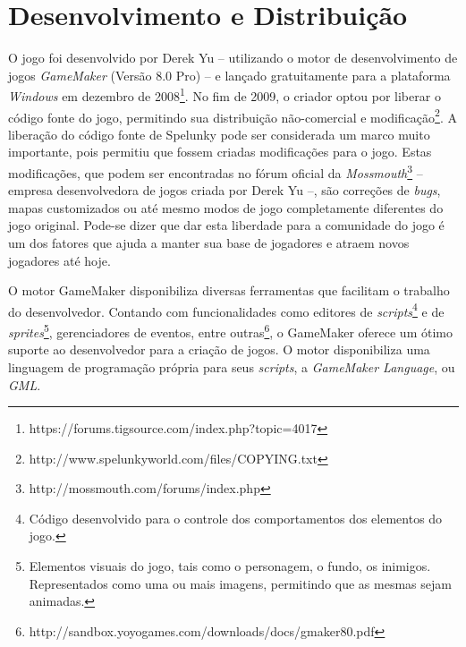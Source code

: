 \section{\label{section:spelunky-dev}Desenvolvimento e Distribuição}
O jogo foi desenvolvido por Derek Yu -- utilizando o motor de desenvolvimento de
jogos \textit{GameMaker} (Versão 8.0 Pro) -- e lançado gratuitamente para a
plataforma \textit{Windows} em dezembro de
2008\footnote{https://forums.tigsource.com/index.php?topic=4017}. No fim de
2009, o criador optou por liberar o código fonte do jogo, permitindo sua
distribuição não-comercial e
modificação\footnote{http://www.spelunkyworld.com/files/COPYING.txt}. A
liberação do código fonte de Spelunky pode ser considerada um marco muito
importante, pois permitiu que fossem criadas modificações para o jogo. Estas
modificações, que podem ser encontradas no fórum oficial da
\textit{Mossmouth}\footnote{http://mossmouth.com/forums/index.php} -- empresa
desenvolvedora de jogos criada por Derek Yu --, são correções de \textit{bugs},
mapas customizados ou até mesmo modos de jogo completamente diferentes do jogo
original. Pode-se dizer que dar esta liberdade para a comunidade do jogo é um
dos fatores que ajuda a manter sua base de jogadores e atraem novos jogadores
até hoje.

O motor GameMaker disponibiliza diversas ferramentas que facilitam o trabalho
do desenvolvedor. Contando com funcionalidades como editores de
\textit{scripts}\footnote{Código desenvolvido para o controle dos
comportamentos dos elementos do jogo.} e de \textit{sprites}\footnote{Elementos
visuais do jogo, tais como o personagem, o fundo, os inimigos. Representados
como uma ou mais imagens, permitindo que as mesmas sejam animadas.},
gerenciadores de eventos, entre
outras\footnote{http://sandbox.yoyogames.com/downloads/docs/gmaker80.pdf}, o
GameMaker oferece um ótimo suporte ao desenvolvedor para a criação de jogos. O
motor disponibiliza uma linguagem de programação própria para seus
\textit{scripts}, a \textit{GameMaker Language}, ou \textit{GML}.
